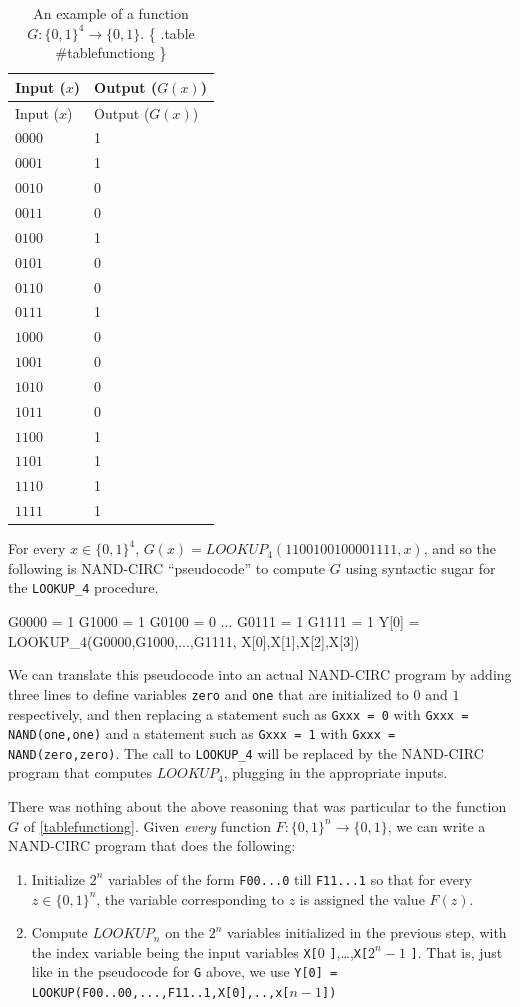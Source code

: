 \begin{longtable}[]{@{}ll@{}}
\caption{An example of a function \(G:\{0,1\}^4 \rightarrow \{0,1\}\).
\{ .table \#tablefunctiong \}}\tabularnewline
\toprule
Input (\(x\)) & Output (\(G(x)\))\tabularnewline
\midrule
\endfirsthead
\toprule
Input (\(x\)) & Output (\(G(x)\))\tabularnewline
\midrule
\endhead
\(0000\) & 1\tabularnewline
\(0001\) & 1\tabularnewline
\(0010\) & 0\tabularnewline
\(0011\) & 0\tabularnewline
\(0100\) & 1\tabularnewline
\(0101\) & 0\tabularnewline
\(0110\) & 0\tabularnewline
\(0111\) & 1\tabularnewline
\(1000\) & 0\tabularnewline
\(1001\) & 0\tabularnewline
\(1010\) & 0\tabularnewline
\(1011\) & 0\tabularnewline
\(1100\) & 1\tabularnewline
\(1101\) & 1\tabularnewline
\(1110\) & 1\tabularnewline
\(1111\) & 1\tabularnewline
\bottomrule
\end{longtable}

For every \(x\in \{0,1\}^4\),
\(G(x)=\ensuremath{\mathit{LOOKUP}}_4(1100100100001111,x)\), and so the
following is NAND-CIRC ``pseudocode'' to compute \(G\) using syntactic
sugar for the \texttt{LOOKUP\_4} procedure.

\begin{code}
G0000 = 1
G1000 = 1
G0100 = 0
...
G0111 = 1
G1111 = 1
Y[0] = LOOKUP_4(G0000,G1000,...,G1111,
                X[0],X[1],X[2],X[3])
\end{code}

We can translate this pseudocode into an actual NAND-CIRC program by
adding three lines to define variables \texttt{zero} and \texttt{one}
that are initialized to \(0\) and \(1\) respectively, and then replacing
a statement such as \texttt{Gxxx = 0} with \texttt{Gxxx = NAND(one,one)}
and a statement such as \texttt{Gxxx = 1} with
\texttt{Gxxx = NAND(zero,zero)}. The call to \texttt{LOOKUP\_4} will be
replaced by the NAND-CIRC program that computes
\(\ensuremath{\mathit{LOOKUP}}_4\), plugging in the appropriate inputs.

There was nothing about the above reasoning that was particular to the
function \(G\) of \cref{tablefunctiong}. Given \emph{every} function
\(F: \{0,1\}^n \rightarrow \{0,1\}\), we can write a NAND-CIRC program
that does the following:

\begin{enumerate}
\def\labelenumi{\arabic{enumi}.}
\item
  Initialize \(2^n\) variables of the form \texttt{F00...0} till
  \texttt{F11...1} so that for every \(z\in\{0,1\}^n\), the variable
  corresponding to \(z\) is assigned the value \(F(z)\).
\item
  Compute \(\ensuremath{\mathit{LOOKUP}}_n\) on the \(2^n\) variables
  initialized in the previous step, with the index variable being the
  input variables \texttt{X[}\(0\)
  \texttt{]},\ldots,\texttt{X[}\(2^n-1\) \texttt{]}. That is, just like
  in the pseudocode for \texttt{G} above, we use
  \texttt{Y[0] = LOOKUP(F00..00,...,F11..1,X[0],..,x[}\(n-1\)\texttt{])}
\end{enumerate}

